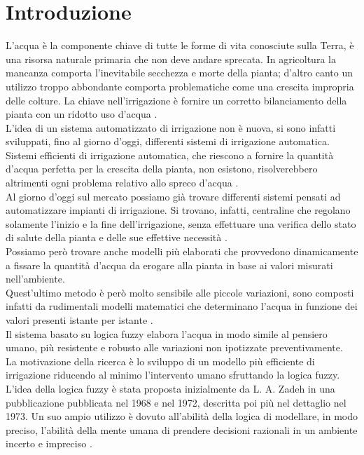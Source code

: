\documentclass[conference,10pt]{IEEEtran}
\begin{document}
\section{Introduzione}\label{sec:intro}
L'acqua è la componente chiave di tutte le forme di vita conosciute sulla Terra, è una risorsa naturale primaria che non deve andare sprecata. In agricoltura la mancanza comporta l'inevitabile secchezza e morte della pianta; d'altro canto un utilizzo troppo abbondante comporta problematiche come una crescita impropria delle colture. La chiave nell'irrigazione è fornire un corretto bilanciamento della pianta con un ridotto uso d'acqua \cite{2}.\\
L'idea di un sistema automatizzato di irrigazione non è nuova, si sono infatti sviluppati, fino al giorno d'oggi, differenti sistemi di irrigazione automatica. Sistemi efficienti di irrigazione automatica, che riescono a fornire la quantità d'acqua perfetta per la crescita della pianta, non esistono, risolverebbero altrimenti ogni problema relativo allo spreco d'acqua \cite{4}.\\
Al giorno d'oggi sul mercato possiamo già trovare differenti sistemi pensati ad automatizzare impianti di irrigazione.
Si trovano, infatti, centraline che regolano solamente l'inizio e la fine dell'irrigazione, senza effettuare una verifica dello stato di salute della pianta e delle sue effettive necessità \cite{1}.\\
Possiamo però trovare anche modelli più elaborati che provvedono dinamicamente a fissare la quantità d'acqua da erogare alla pianta in base ai valori misurati nell'ambiente.\\
Quest'ultimo metodo è però molto sensibile alle piccole variazioni, sono composti infatti da rudimentali modelli matematici che determinano l'acqua in funzione dei valori presenti istante per istante \cite{3}. \\
Il sistema basato su logica fuzzy elabora l'acqua in modo simile al pensiero umano, più resistente e robusto alle variazioni non ipotizzate preventivamente. \\
La motivazione della ricerca è lo sviluppo di un modello più efficiente di irrigazione riducendo al minimo l'intervento umano sfruttando la logica fuzzy.
L'idea della logica fuzzy è stata proposta inizialmente da L. A. Zadeh in una pubblicazione pubblicata nel 1968 e nel 1972, descritta poi più nel dettaglio nel 1973.
Un suo ampio utilizzo è dovuto all'abilità della logica di modellare, in modo preciso, l'abilità della mente umana di prendere decisioni razionali in un ambiente incerto e impreciso \cite{9}.\\
\end{document}

